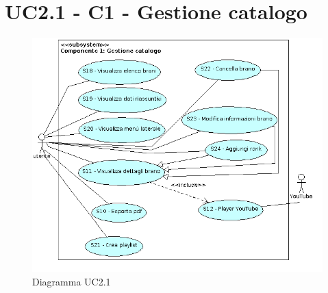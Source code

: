 \section{UC2.1 - C1 - Gestione catalogo}
\begin{figure}[h]
  \centering
  \includegraphics[width=14cm]{img/AR/UC2_1.png}
\caption{Diagramma UC2.1}
\end{figure}

